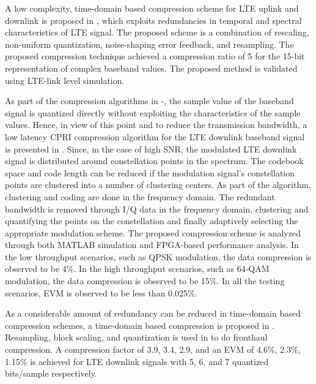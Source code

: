\begin{multicols}{2}
\begin{itemize}
A low complexity, time-domain based compression scheme for LTE uplink and downlink is proposed in \cite{art3-key66}, which exploits redundancies in temporal and spectral characteristics of LTE signal. The proposed scheme is a combination of rescaling, non-uniform quantization, noise-shaping error feedback, and resampling. The proposed compression technique achieved a compression ratio of 5 for the 15-bit representation of complex baseband values. The proposed method is validated using LTE-link level simulation.

As part of the compression algorithms in \cite{art3-key67}-\cite{art3-key63}, the sample value of the baseband signal is quantized directly without exploiting the characteristics of the sample values. Hence, in view of this point and to reduce the transmission bandwidth, a low latency CPRI compression algorithm for the LTE downlink baseband signal is presented in \cite{art3-key68}. Since, in the case of high SNR, the modulated LTE downlink signal is distributed around constellation points in the spectrum. The codebook space and code length can be reduced if the modulation signal’s constellation points are clustered into a number of clustering centers. As part of the algorithm, clustering and coding are done in the frequency domain. The redundant bandwidth is removed through I/Q data in the frequency domain, clustering and quantifying the points on the constellation and finally adaptively selecting the appropriate modulation scheme. The proposed compression scheme is analyzed through both MATLAB simulation and FPGA-based performance analysis. In the low throughput scenarios, such as QPSK modulation, the data compression is observed to be 4\%. In the high throughput scenarios, such as 64-QAM modulation, the data compression is observed to be 15\%. In all the testing scenarios, EVM is observed to be less than 0.025\%.

As a considerable amount of redundancy can be reduced in time-domain based compression schemes, a time-domain based compression is proposed in \cite{art3-key69}. Resampling, block scaling, and quantization is used in \cite{art3-key69} to do fronthaul compression. A compression factor of 3.9, 3.4, 2.9, and an EVM of 4.6\%, 2.3\%, 1.15\% is achieved for LTE downlink signals with 5, 6, and 7 quantized bits/sample respectively.


\end{itemize}
\end{multicols}
